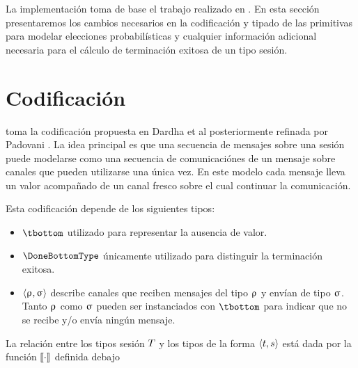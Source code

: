 La implementación toma de base el trabajo realizado en \FuSe. En esta sección
presentaremos los cambios necesarios en la codificación y tipado de las
primitivas para modelar elecciones probabilísticas y cualquier información
adicional necesaria para el cálculo de terminación exitosa de un tipo sesión.

\section{Codificación}

\FuSe toma la codificación propuesta en Dardha et al 
posteriormente refinada por Padovani . La idea principal es que una
secuencia de mensajes sobre una sesión puede modelarse como una secuencia de
comunicaciónes de un mensaje sobre canales que pueden utilizarse una única
vez. En este modelo cada mensaje lleva un valor acompañado de un canal fresco
sobre el cual continuar la comunicación.

Esta codificación depende de los siguientes tipos:

\begin{itemize}
	\item $\tbottom$ utilizado para representar la ausencia de
		valor.
	\item $\DoneBottomType$ únicamente utilizado para
		distinguir la terminación exitosa.
	\item $\langle\uprho_{},\upsigma_{}\rangle$ describe canales que
		reciben mensajes del tipo $\uprho_{}$ y envían de tipo $\upsigma_{}$.
		Tanto $\uprho_{}$ como $\upsigma_{}$ pueden ser instanciados con
		$\tbottom$ para indicar que no se recibe y/o envía ningún
		mensaje.
\end{itemize}

La relación entre los tipos sesión $T$ y los tipos de la forma
$\langle t,s\rangle$ está dada por la función $\llbracket\cdot\rrbracket$ definida debajo

